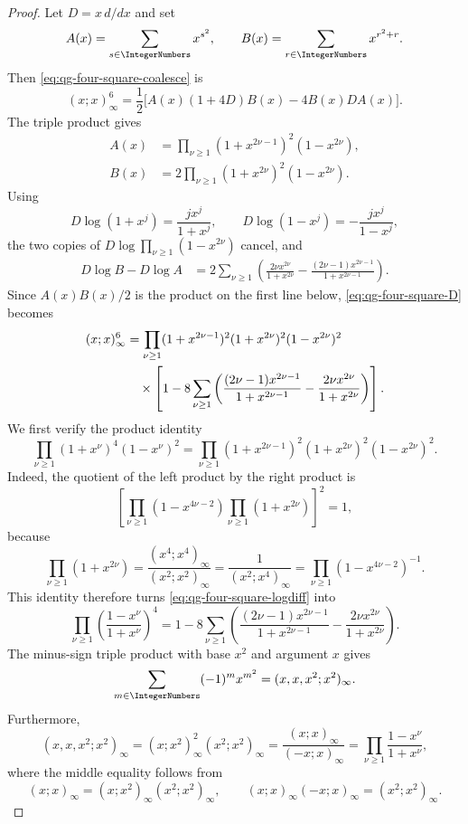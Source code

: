 \begin{proof}
Let $D=x\,d/dx$ and set
\[
 A(x)=\sum_{s\in\IntegerNumbers}x^{s^2},
 \qquad
 B(x)=\sum_{r\in\IntegerNumbers}x^{r^2+r}.
\]
Then \eqref{eq:qg-four-square-coalesce} is
\begin{equation}
 (x;x)_\infty^6
 =\frac12\bigl[A(x)(1+4D)B(x)-4B(x)DA(x)\bigr].
\label{eq:qg-four-square-D}
\end{equation}
The triple product gives
\begin{align}
 A(x)&=\prod_{\nu\ge1}(1+x^{2\nu-1})^2(1-x^{2\nu}),
 \label{eq:qg-A-product}\\
 B(x)&=2\prod_{\nu\ge1}(1+x^{2\nu})^2(1-x^{2\nu}).
 \label{eq:qg-B-product}
\end{align}
Using
\[
 D\log(1+x^j)=\frac{jx^j}{1+x^j},
 \qquad
 D\log(1-x^j)=-\frac{jx^j}{1-x^j},
\]
the two copies of
$D\log\prod_{\nu\ge1}(1-x^{2\nu})$ cancel, and
\begin{align*}
 D\log B-D\log A
 &=2\sum_{\nu\ge1}\left(
   \frac{2\nu x^{2\nu}}{1+x^{2\nu}}
   -\frac{(2\nu-1)x^{2\nu-1}}{1+x^{2\nu-1}}
   \right).
\end{align*}
Since $A(x)B(x)/2$ is the product on the first line below,
\eqref{eq:qg-four-square-D} becomes
\begin{align}
 (x;x)_\infty^6
 &=\prod_{\nu\ge1}
 (1+x^{2\nu-1})^2(1+x^{2\nu})^2(1-x^{2\nu})^2\notag\\
 &\quad\times\left[
 1-8\sum_{\nu\ge1}\left(
 \frac{(2\nu-1)x^{2\nu-1}}{1+x^{2\nu-1}}
 -\frac{2\nu x^{2\nu}}{1+x^{2\nu}}
 \right)\right].
\label{eq:qg-four-square-logdiff}
\end{align}
We first verify the product identity
\[
 \prod_{\nu\ge1}(1+x^\nu)^4(1-x^\nu)^2
 =\prod_{\nu\ge1}
 (1+x^{2\nu-1})^2(1+x^{2\nu})^2(1-x^{2\nu})^2.
\]
Indeed, the quotient of the left product by the right product is
\[
 \left[
 \prod_{\nu\ge1}(1-x^{4\nu-2})
 \prod_{\nu\ge1}(1+x^{2\nu})
 \right]^2=1,
\]
because
\[
 \prod_{\nu\ge1}(1+x^{2\nu})
 =\frac{(x^4;x^4)_\infty}{(x^2;x^2)_\infty}
 =\frac1{(x^2;x^4)_\infty}
 =\prod_{\nu\ge1}(1-x^{4\nu-2})^{-1}.
\]
This identity therefore turns \eqref{eq:qg-four-square-logdiff} into
\begin{equation}
 \prod_{\nu\ge1}\left(\frac{1-x^\nu}{1+x^\nu}\right)^4
 =1-8\sum_{\nu\ge1}\left(
 \frac{(2\nu-1)x^{2\nu-1}}{1+x^{2\nu-1}}
 -\frac{2\nu x^{2\nu}}{1+x^{2\nu}}
 \right).
\label{eq:qg-four-square-quotient}
\end{equation}
The minus-sign triple product with base $x^2$ and argument $x$ gives
\[
 \sum_{m\in\IntegerNumbers}(-1)^mx^{m^2}
 =(x,x,x^2;x^2)_\infty.
\]
Furthermore,
\[
 (x,x,x^2;x^2)_\infty
 =(x;x^2)_\infty^2(x^2;x^2)_\infty
 =\frac{(x;x)_\infty}{(-x;x)_\infty}
 =\prod_{\nu\ge1}\frac{1-x^\nu}{1+x^\nu},
\]
where the middle equality follows from
\[
 (x;x)_\infty=(x;x^2)_\infty(x^2;x^2)_\infty,
 \qquad
 (x;x)_\infty(-x;x)_\infty=(x^2;x^2)_\infty.
\]


\end{proof}
